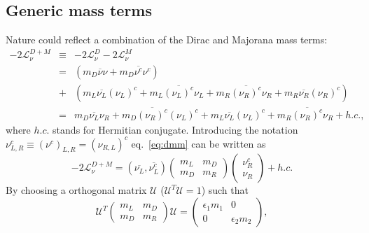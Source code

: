 \subsection{Generic mass terms}
\label{sec:genma}
Nature could reflect a combination of the Dirac and Majorana mass terms:
\begin{equation}
  \label{eq:dmm}
  \begin{array}{ccl}
    -2\mathcal{L}_{\nu}^{D+M} &\equiv& -2\mathcal{L}_{\nu}^{D}             -2\mathcal{L}_{\nu}^{M}\\ &=& \displaystyle{( 
      m_{D}\overline{\nu}\nu +
      m_{D}\overline{\nu^{c}}\nu^{c} )}\\ &+& \displaystyle{(             m_{L}\overline{\nu_{L}}(\nu_{L})^{c} +                         m_{L}\overline{(\nu_{L})^{c}}\nu_{L} +                   m_{R}\overline{(\nu_{R})^{c}}\nu_{R} +                                      m_{R}\overline{\nu_{R}}(\nu_{R})^{c})}\\ &=&\displaystyle{
      m_{D}\overline{\nu_{L}}\nu_{R} +
      m_{D}\overline{(\nu_{R})^{c}}(\nu_{L})^{c} +
      m_{L}\overline{\nu_{L}}(\nu_{L})^{c} + 
      m_{R}\overline{(\nu_{R})^{c}}\nu_{R} + h.c.},
  \end{array}
\end{equation}
where $h.c.$ stands for Hermitian conjugate. Introducing the notation $\nu^{c}_{L,R} \equiv (\nu^{c})_{L,R} = (\nu_{R,L})^{c}$ eq.~\ref{eq:dmm} can be written as
\begin{equation}
  \label{eq:mm}
  -2\mathcal{L}_{\nu}^{D+M} =       \left(\overline{\nu_{L}},\overline{\nu^{c}_{L}}\right)
  \left(\begin{array}{cc}m_L & m_D \\ m_D & m_R\end{array}\right)
  \left(\begin{array}{c}\nu^{c}_R \\ \nu_R\end{array}\right) + h.c.
\end{equation}
By choosing a orthogonal matrix $\mathcal{U}$ ($\mathcal{U}^{T}
\mathcal{U} = 1$) such that
\begin{equation}
  \label{eq:mmat}
  \mathcal{U}^{T}\left(\begin{array}{cc}m_L & m_D \\ m_D &       
m_R\end{array}\right)\mathcal{U} = 
  \left(\begin{array}{cc}\epsilon_{1}m_1 & 0 \\ 0 &            
\epsilon_{2}m_2\end{array}\right),
\end{equation}
